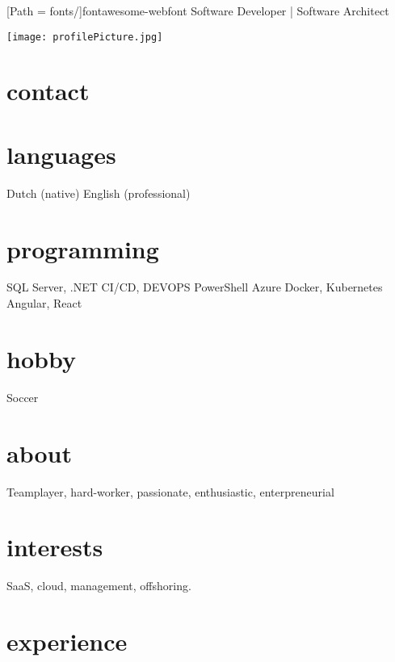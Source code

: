 \documentclass[]{friggeri-cv}
\begin{document}
\newfontfamily{\FA}[Path = fonts/]{fontawesome-webfont}
       {Software Developer | Software Architect}

\begin{aside}
  \texttt{[image: profilePicture.jpg]}
  \section{contact}
    \href{https://www.google.com/maps/place/Tilburg/@51.5737217,4.9686496,12z}{{\FA \faMapMarker}}
    \href{mailto:pietervdheijden@gmail.com}{{\FA \faEnvelope}}
    \href{https://nl.linkedin.com/in/pietervdheijden}{{\FA \faLinkedin}}
    \href{https://github.com/pietervdheijden}{{\FA \faGithub}}
  \section{languages}
    Dutch (native)
    English (professional)
  \section{programming}
    {SQL Server, .NET}
    {CI/CD, DEVOPS}
    {PowerShell}
    {Azure}
    {Docker, Kubernetes}
    {Angular, React}
  \section{hobby}
    Soccer
\end{aside}

\section{about}
Teamplayer, hard-worker, passionate, enthusiastic, enterpreneurial

\section{interests}
SaaS, cloud, management, offshoring.

\section{experience}
\end{document}
